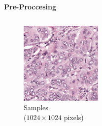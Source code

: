 \documentclass[usenames,dvipsnames]{beamer}
\begin{document}
\begin{frame}{\textbf{Pre-Proccesing}}
\begin{columns}
         \begin{figure}
             \centering
             \includegraphics[height=4cm, width=4cm]{imagmetodo/patient_012_node_0_0_33.jpg}
             \caption*{\centering \large Samples \\ \small ($1024 \times 1024$ pixels)}
         \end{figure}
    \end{columns}
\end{frame}
\end{document}
